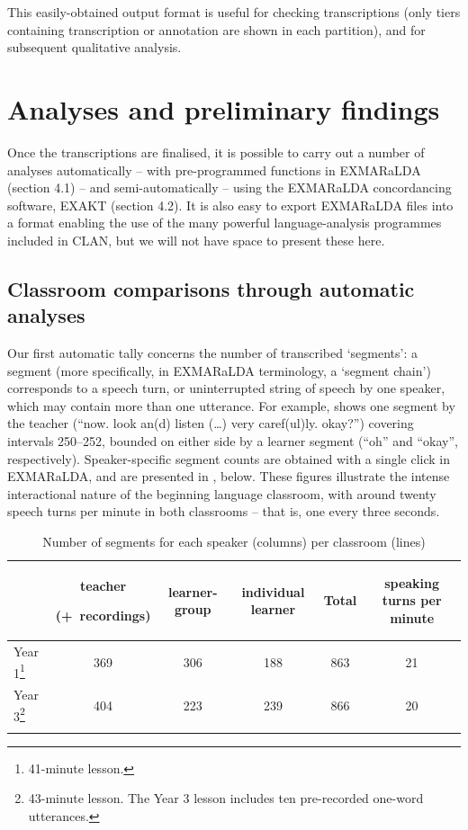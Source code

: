 \documentclass[output=paper,colorlinks,citecolor=brown,modfonts,nonflat]{../langscibook}
\begin{document}
This easily-obtained output format is useful for checking transcriptions (only tiers containing transcription or annotation are shown in each partition), and for subsequent qualitative analysis.

\section{Analyses and preliminary findings} \label{sec:hilton:4}

Once the transcriptions are finalised, it is possible to carry out a number of analyses automatically – with pre-programmed functions in EXMARaLDA (section 4.1) – and semi-automatically – using the EXMARaLDA concordancing software, EXAKT (section 4.2). It is also easy to export EXMARaLDA files into a format enabling the use of the many powerful language-analysis programmes included in CLAN, but we will not have space to present these here.

\subsection{Classroom comparisons through automatic analyses} 

Our first automatic tally concerns the number of transcribed ‘segments’: a segment (more specifically,  in EXMARaLDA terminology, a ‘segment chain’) corresponds to a speech turn, or uninterrupted string of speech by one speaker, which may contain more than one utterance. For example,  shows one segment by the teacher (“now. look an(d) listen (…) very caref(ul)ly. okay?”) covering intervals 250--252, bounded on either side by a learner segment (“oh” and “okay”, respectively). Speaker-specific segment counts are obtained with a single click in EXMARaLDA, and are presented in , below. These figures illustrate the intense interactional nature of the beginning language classroom, with around twenty speech turns per minute in both classrooms – that is, one every three seconds.

\begin{table}
\caption{Number of segments for each speaker (columns) per classroom (lines)\label{tab:hilton:2}}
\small
\begin{tabularx}{\textwidth}{QCCCCC}
\lsptoprule
& {\raggedright teacher}\newline\raggedright(+~recordings) & learner-group & individual learner & Total & speaking turns per minute\\
 \midrule
Year 1\footnote{41-minute  lesson.} & 369 & 306 & 188 & 863 & 21\\
Year 3\footnote{43-minute  lesson. The Year 3 lesson includes ten pre-recorded one-word utterances.} & 404 & 223 & 239 & 866 & 20\\
\lspbottomrule
\end{tabularx}
\end{table}
\end{document}
